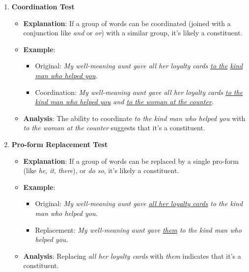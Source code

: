 \begin{enumerate}[noitemsep]
    \item \textbf{Coordination Test}
    \begin{itemize}[noitemsep]
        \item \textbf{Explanation}: If a group of words can be coordinated (joined with a conjunction like \textit{and} or \textit{or}) with a similar group, it's likely a constituent.
        \item \textbf{Example}:
        \begin{itemize}[noitemsep]
            \item Original: \textit{My well-meaning aunt gave all her loyalty cards \underline{to the} \underline{kind man who helped you}.}
            \item Coordination: \textit{My well-meaning aunt gave all her loyalty cards \underline{to the kind man who helped you} and \underline{to the woman at the counter}.}
        \end{itemize}
        \item \textbf{Analysis}: The ability to coordinate \textit{to the kind man who helped you} with \textit{to the woman at the counter} suggests that it's a constituent.
    \end{itemize}
    
    \item \textbf{Pro-form Replacement Test}
    \begin{itemize}[noitemsep]
        \item \textbf{Explanation}: If a group of words can be replaced by a single pro-form (like \textit{he}, \textit{it}, \textit{there}), or \textit{do so}, it's likely a constituent.
        \item \textbf{Example}:
        \begin{itemize}[noitemsep]
            \item Original: \textit{My well-meaning aunt gave \underline{all her loyalty cards} to the kind man who helped you.}
            \item Replacement: \textit{My well-meaning aunt gave \underline{them} to the kind man who helped you.}
        \end{itemize}
        \item \textbf{Analysis}: Replacing \textit{all her loyalty cards} with \textit{them} indicates that it's a constituent.
    \end{itemize}
    

\end{enumerate}
